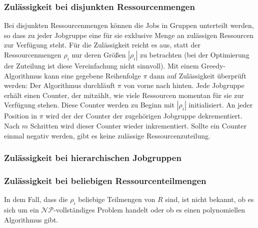 \documentclass{scrreprt}
\begin{document}
\subsubsection{Zulässigkeit bei disjunkten Ressourcenmengen}
Bei disjunkten Ressourcenmengen können die Jobs in Gruppen unterteilt werden, 
so dass zu jeder Jobgruppe eine für sie exklusive Menge an zulässigen Ressourcen zur Verfügung steht.
Für die Zulässigkeit reicht es aus, statt der Ressourcenmengen $\rho_i$ nur deren Größen $|\rho_i|$ zu betrachten
(bei der Optimierung der Zuteilung ist diese Vereinfachung nicht sinnvoll).
Mit einem Greedy-Algorithmus kann eine gegebene Reihenfolge $\pi$ dann auf Zulässigkeit überprüft werden:
Der Algorithmus durchläuft $\pi$ von vorne nach hinten.
Jede Jobgruppe erhält einen Counter, der mitzählt, wie viele Ressourcen momentan für sie zur Verfügung stehen.
Diese Counter werden zu Beginn mit $|\rho_i|$ initialisiert.
An jeder Position in $\pi$ wird der der Counter der zugehörigen Jobgruppe dekrementiert.
Nach $m$ Schritten wird dieser Counter wieder inkrementiert.
Sollte ein Counter einmal negativ werden, gibt es keine zulässige Ressourcenzuteilung.

\subsubsection{Zulässigkeit bei hierarchischen Jobgruppen}
%

\subsubsection{Zulässigkeit bei beliebigen Ressourcenteilmengen}
In dem Fall, dass die $\rho_i$ beliebige Teilmengen von $R$ sind, ist nicht bekannt, ob es sich um ein $\mathcal{NP}$-vollständiges Problem handelt
oder ob es einen polynomiellen Algorithmus gibt.
\end{document}
